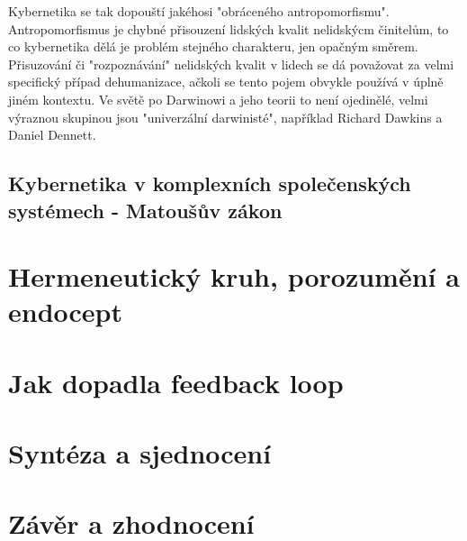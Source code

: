 \documentclass[11pt,a4paper]{article}
\begin{document}
Kybernetika se tak dopouští jakéhosi "obráceného antropomorfismu". Antropomorfismus je chybné přisouzení lidských kvalit nelidskýcm činitelům, to co kybernetika dělá je problém stejného charakteru, jen opačným směrem. Přisuzování či "rozpoznávání" nelidských kvalit v lidech se dá považovat za velmi specifický případ dehumanizace, ačkoli se tento pojem obvykle používá v úplně jiném kontextu. Ve světě po Darwinowi a jeho teorii to není ojedinělé, velmi výraznou skupinou jsou "univerzální darwinisté", například Richard Dawkins a Daniel Dennett. 


\subsection{Kybernetika v komplexních společenských systémech - Matoušův zákon}



\section{Hermeneutický kruh, porozumění a endocept}





\section{Jak dopadla feedback loop}





\section{Syntéza a sjednocení}





\section{Závěr a zhodnocení}


\newpage

\printbibliography[heading=bibintoc, title={Bibliografie}]
\end{document}
